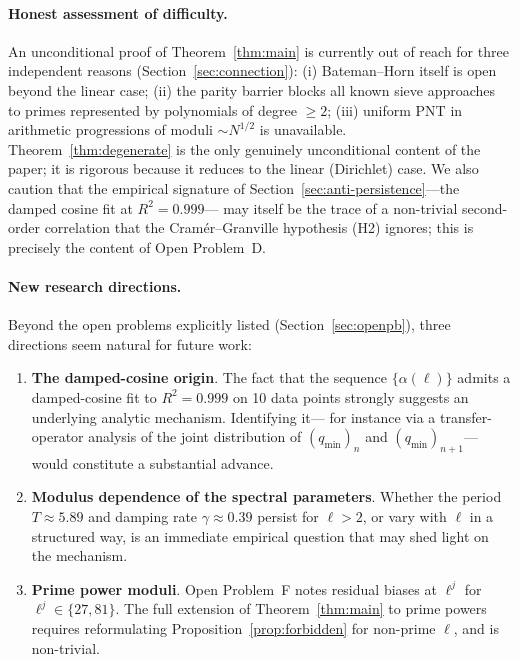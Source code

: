 \documentclass[11pt,a4paper]{article}
\theoremstyle{plain}
\theoremstyle{definition}
\newcommand{\qmin}{q_{\min}}
\begin{document}
\paragraph{Honest assessment of difficulty.} An unconditional proof of
Theorem~\ref{thm:main} is currently out of reach for three independent
reasons (Section~\ref{sec:connection}): (i) Bateman--Horn itself is open
beyond the linear case; (ii) the parity barrier blocks all known sieve
approaches to primes represented by polynomials of degree $\ge 2$;
(iii) uniform PNT in arithmetic progressions of moduli $\sim N^{1/2}$ is
unavailable. Theorem~\ref{thm:degenerate} is the only genuinely unconditional
content of the paper; it is rigorous because it reduces to the linear
(Dirichlet) case. We also caution that the empirical signature of
Section~\ref{sec:anti-persistence}---the damped cosine fit at $R^2 = 0.999$---
may itself be the trace of a non-trivial second-order correlation that the
Cramér--Granville hypothesis (H2) ignores; this is precisely the content of
Open Problem~D.

\paragraph{New research directions.} Beyond the open problems explicitly
listed (Section~\ref{sec:openpb}), three directions seem natural for future
work:
\begin{enumerate}[leftmargin=*]
\item \textbf{The damped-cosine origin}. The fact that the sequence
$\{\alpha(\ell)\}$ admits a damped-cosine fit to $R^2 = 0.999$ on 10 data
points strongly suggests an underlying analytic mechanism. Identifying it---
for instance via a transfer-operator analysis of the joint distribution of
$(\qmin)_n$ and $(\qmin)_{n+1}$---would constitute a substantial advance.
\item \textbf{Modulus dependence of the spectral parameters}. Whether the
period $T \approx 5.89$ and damping rate $\gamma \approx 0.39$ persist for
$\ell > 2$, or vary with $\ell$ in a structured way, is an immediate empirical
question that may shed light on the mechanism.
\item \textbf{Prime power moduli}. Open Problem~F notes residual biases at
$\ell^j$ for $\ell^j \in \{27, 81\}$. The full extension of
Theorem~\ref{thm:main} to prime powers requires reformulating
Proposition~\ref{prop:forbidden} for non-prime $\ell$, and is non-trivial.
\end{enumerate}
\end{document}
